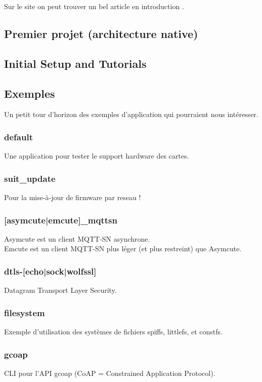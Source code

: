 Sur le site on peut trouver un bel article en introduction \cite{ref10}.

\subsection{Premier projet \cite{ref12} (architecture native)}


\subsection{Initial Setup and Tutorials \cite{ref13}}


\subsection{Exemples}
Un petit tour d'horizon des exemples d'application qui pourraient nous
intéresser.

\subsubsection{default}
Une application pour tester le support hardware des cartes.

\subsubsection{suit\_update}
Pour la mise-à-jour de firmware par reseau !

\subsubsection{[asymcute|emcute]\_mqttsn}
Asymcute est un client MQTT-SN asynchrone.\\
Emcute est un client MQTT-SN plus léger (et plus restreint) que
Asymcute.

\subsubsection{dtls-[echo|sock|wolfssl]}
Datagram Transport Layer Security.

\subsubsection{filesystem}
Exemple d'utilisation des systèmes de fichiers spiffs, littlefs, et
constfs.

\subsubsection{gcoap}
CLI pour l'API gcoap (CoAP = Constrained Application Protocol).

